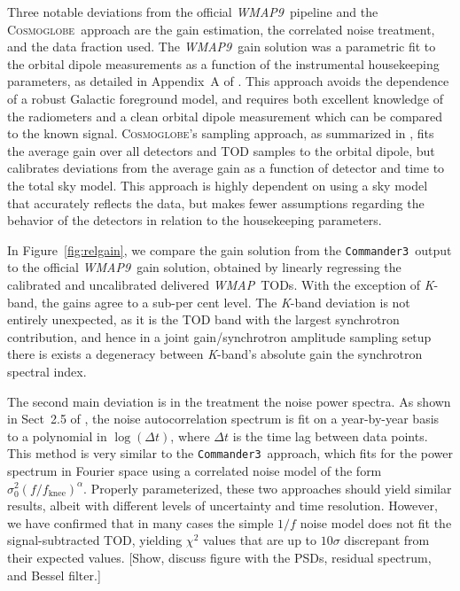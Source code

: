 \documentclass[twocolumn]{../../common/aa}
\def\WMAP{\emph{WMAP}}
\def\WMAPnine{\emph{WMAP9}}
\def\commanderthree{\texttt{Commander3}}
\newcommand{\cosmoglobe}{\textsc{Cosmoglobe}}
\newcommand{\K}[0]{\textit K}
\begin{document}
Three notable deviations from the official \WMAPnine\ pipeline and the
\cosmoglobe\ approach are the gain estimation, the correlated noise treatment, and the data fraction used.
The \WMAPnine\ gain solution was a parametric fit to the orbital dipole
measurements as a function of the instrumental housekeeping parameters, as
detailed in Appendix~A of \citet{wmapexsupp}. This approach avoids the
dependence of a robust Galactic foreground model, and requires both excellent
knowledge of the radiometers and a clean orbital dipole measurement which can
be compared to the known signal. \cosmoglobe's sampling approach, as summarized
in \citet{bp07}, fits the average gain over all detectors and TOD samples to the orbital dipole, but calibrates deviations from the average gain as a function of detector and time to the total sky model. This approach is highly dependent on using a sky model that accurately reflects the data, but makes fewer assumptions regarding the behavior of the detectors in relation to the housekeeping parameters. 

In Figure~\ref{fig:relgain}, we compare the gain solution from the \commanderthree\ output to the official \WMAPnine\ gain solution, obtained by linearly regressing the calibrated and uncalibrated delivered \WMAP\ TODs. With the exception of \K-band, the gains agree to a sub-per cent level. The \K-band deviation is not entirely unexpected, as it is the TOD band with the largest synchrotron contribution, and hence in a joint gain/synchrotron amplitude sampling setup there is exists a degeneracy between \K-band's absolute gain the synchrotron spectral index.

The second main deviation is in the treatment the noise power spectra. As shown in Sect~2.5 of \citet{jarosik2007}, the noise autocorrelation spectrum is fit on a year-by-year basis to a polynomial in $\log(\Delta t)$, where $\Delta t$ is the time lag between data points. This method is very similar to the \commanderthree\ approach, which fits for the power spectrum in Fourier space using a correlated noise model of the form $\sigma_0^2(f/f_\mathrm{knee})^{\alpha}$. Properly parameterized, these two approaches should yield similar results, albeit with different levels of uncertainty and time resolution. However, we have confirmed that in many cases the simple $1/f$ noise model does not fit the signal-subtracted TOD, yielding $\chi^2$ values that are up to $10\sigma$ discrepant from their expected values.
[Show, discuss figure with the PSDs, residual spectrum, and Bessel filter.]
\end{document}
